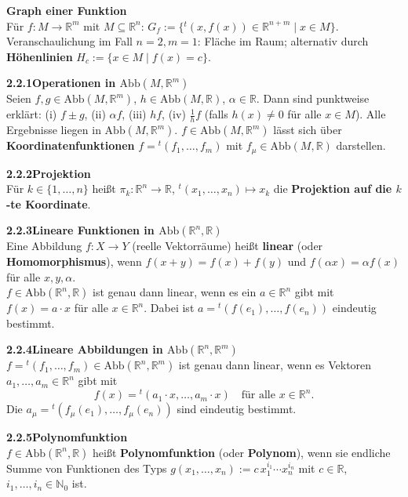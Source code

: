 \documentclass[a4paper,12pt]{article}
\newcommand{\gentry}[3]{%
  \noindent\textbf{#1\quad #2}\nopagebreak\\[0.2em]
  #3\par\smallskip
}
\begin{document}
\gentry{}{Graph einer Funktion}{%
  Für $f: M \to \mathbb{R}^m$ mit $M \subseteq \mathbb{R}^n$:
  $G_f := \{{}^t(x, f(x)) \in \mathbb{R}^{n+m} \mid x \in M\}$.
  Veranschaulichung im Fall $n = 2, m = 1$: Fläche im Raum; alternativ durch
  \textbf{Höhenlinien} $H_c := \{x \in M \mid f(x) = c\}$.
}

\gentry{2.2.1}{Operationen in $\mathrm{Abb}(M, \mathbb{R}^m)$}{%
  Seien $f, g \in \mathrm{Abb}(M, \mathbb{R}^m)$, $h \in \mathrm{Abb}(M, \mathbb{R})$,
  $\alpha \in \mathbb{R}$. Dann sind punktweise erklärt:
  (i) $f \pm g$, \quad (ii) $\alpha f$, \quad (iii) $hf$,
  \quad (iv) $\frac{1}{h} f$ (falls $h(x) \neq 0$ für alle $x \in M$).
  Alle Ergebnisse liegen in $\mathrm{Abb}(M, \mathbb{R}^m)$.
  $f \in \mathrm{Abb}(M, \mathbb{R}^m)$ lässt sich über \textbf{Koordinatenfunktionen}
  $f = {}^t(f_1, \ldots, f_m)$ mit $f_\mu \in \mathrm{Abb}(M, \mathbb{R})$ darstellen.
}

\gentry{2.2.2}{Projektion}{%
  Für $k \in \{1, \ldots, n\}$ heißt
  $\pi_k: \mathbb{R}^n \to \mathbb{R}$, ${}^t(x_1, \ldots, x_n) \mapsto x_k$
  die \textbf{Projektion auf die $k$-te Koordinate}.
}

\gentry{2.2.3}{Lineare Funktionen in $\mathrm{Abb}(\mathbb{R}^n, \mathbb{R})$}{%
  Eine Abbildung $f: X \to Y$ (reelle Vektorräume) heißt \textbf{linear} (oder
  \textbf{Homomorphismus}), wenn
  $f(x + y) = f(x) + f(y)$ und $f(\alpha x) = \alpha f(x)$ für alle $x, y, \alpha$.\\
  $f \in \mathrm{Abb}(\mathbb{R}^n, \mathbb{R})$ ist genau dann linear, wenn es
  ein $a \in \mathbb{R}^n$ gibt mit $f(x) = a \cdot x$ für alle $x \in \mathbb{R}^n$.
  Dabei ist $a = {}^t(f(e_1), \ldots, f(e_n))$ eindeutig bestimmt.
}

\gentry{2.2.4}{Lineare Abbildungen in $\mathrm{Abb}(\mathbb{R}^n, \mathbb{R}^m)$}{%
  $f = {}^t(f_1, \ldots, f_m) \in \mathrm{Abb}(\mathbb{R}^n, \mathbb{R}^m)$ ist
  genau dann linear, wenn es Vektoren $a_1, \ldots, a_m \in \mathbb{R}^n$ gibt mit
  \[
    f(x) = {}^t(a_1 \cdot x, \ldots, a_m \cdot x) \quad \text{für alle } x \in \mathbb{R}^n.
  \]
  Die $a_\mu = {}^t(f_\mu(e_1), \ldots, f_\mu(e_n))$ sind eindeutig bestimmt.
}

\gentry{2.2.5}{Polynomfunktion}{%
  $f \in \mathrm{Abb}(\mathbb{R}^n, \mathbb{R})$ heißt \textbf{Polynomfunktion}
  (oder \textbf{Polynom}), wenn sie endliche Summe von Funktionen des Typs
  $g(x_1, \ldots, x_n) := c\, x_1^{i_1} \cdots x_n^{i_n}$
  mit $c \in \mathbb{R}$, $i_1, \ldots, i_n \in \mathbb{N}_0$ ist.
}
\end{document}
